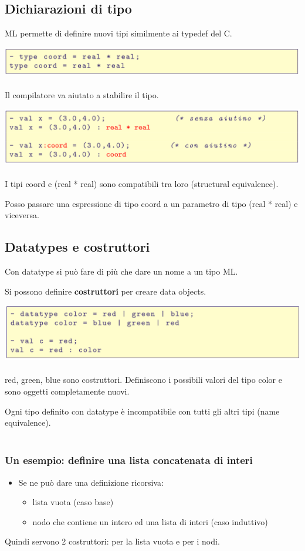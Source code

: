 \documentclass[10pt]{article}
\begin{document}
\subsection{Dichiarazioni di tipo}
ML permette di definire nuovi tipi similmente ai typedef del C.

\includegraphics[scale=0.2]{Immagini/ml12.png}
\\\\
Il compilatore va aiutato a stabilire il tipo.

\includegraphics[scale=0.2]{Immagini/ml13.png}
\\\\
I tipi coord e (real * real) sono compatibili tra loro
(structural equivalence).

Posso passare una espressione di tipo coord a un parametro
di tipo (real * real) e viceversa.
\subsection{Datatypes e costruttori}
Con datatype si può fare di più che dare un nome a un tipo ML.

Si possono definire \textbf{costruttori} per creare data objects.

\includegraphics[scale=0.2]{Immagini/ml14.png}
\\\\
red, green, blue sono costruttori. Definiscono i possibili
valori del tipo color e sono oggetti completamente nuovi.

Ogni tipo definito con datatype è incompatibile con tutti gli
altri tipi (name equivalence).
\\\\
\subsubsection{Un esempio: definire una lista concatenata di interi}
\begin{itemize}
    \item Se ne può dare una definizione ricorsiva:
    \begin{itemize}
        \item lista vuota (caso base)
        \item nodo che contiene un intero ed una lista di interi (caso induttivo)
    \end{itemize}
\end{itemize}
Quindi servono 2 costruttori: per la lista vuota e per i nodi.
\end{document}
